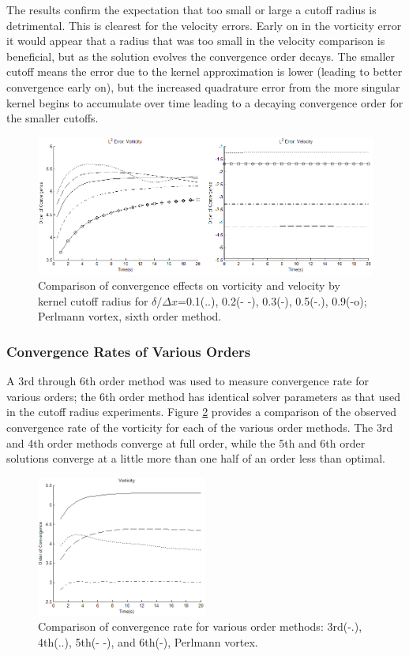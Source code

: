 \documentclass[]{aiaa-tc}%
\begin{document}
The results confirm the expectation that too small or large a cutoff radius is detrimental. This is clearest for the velocity errors. Early on in the vorticity error it would appear that a radius that was too small in the velocity comparison is beneficial, but as the solution evolves the convergence order decays. The smaller cutoff means the error due to the kernel approximation is lower (leading to better convergence early on), but the increased quadrature error from the more singular kernel begins to accumulate over time leading to a decaying convergence order for the smaller cutoffs.
\begin{figure}
\centering
\includegraphics[width=1\textwidth]{CutoffWU.PNG}
\caption{\label{fig:CutoffWU}Comparison of convergence effects on vorticity and velocity by kernel cutoff radius for $\delta/\Delta x$=0.1(..), 0.2(- -), 0.3(-), 0.5(-.), 0.9(-o);  Perlmann vortex, sixth order method.}
\end{figure}

\subsubsection{Convergence Rates of Various Orders}
A 3rd through 6th order method was used to measure convergence rate for various orders; the 6th order method has identical solver parameters as that used in the cutoff radius experiments. Figure \ref{fig:Porder} provides a comparison of the observed convergence rate of the vorticity for each of the various order methods. The 3rd and 4th order methods converge at full order, while the 5th and 6th order solutions converge at a little more than one half of an order less than optimal.

\begin{figure}
\centering
\includegraphics[width=0.5\textwidth]{PorderR.PNG}
\caption{\label{fig:Porder}Comparison of convergence rate for various order methods: 3rd(-.), 4th(..), 5th(- -), and 6th(-), Perlmann vortex.}
\end{figure}
\end{document}
